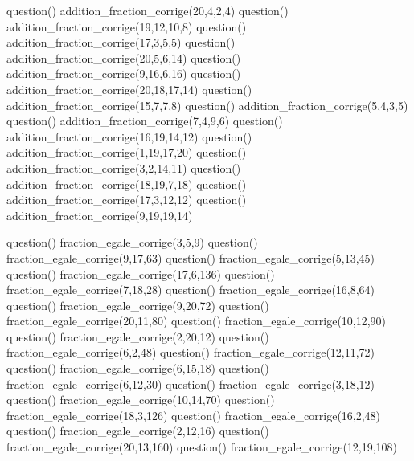 \documentclass["../Cours.tex"]{subfiles}
\begin{document}
\clearpage
\CORRECTIONS

\begin{questions}

    \vspace{-1.5em}
        \begin{multicols}{2}\small
        \begin{luacode}
            question() addition_fraction_corrige(20,4,2,4)
            question() addition_fraction_corrige(19,12,10,8)
            question() addition_fraction_corrige(17,3,5,5)
            question() addition_fraction_corrige(20,5,6,14)
            question() addition_fraction_corrige(9,16,6,16)
            question() addition_fraction_corrige(20,18,17,14)
            question() addition_fraction_corrige(15,7,7,8)
            question() addition_fraction_corrige(5,4,3,5)
            question() addition_fraction_corrige(7,4,9,6)
            question() addition_fraction_corrige(16,19,14,12)
            question() addition_fraction_corrige(1,19,17,20)
            question() addition_fraction_corrige(3,2,14,11)
            question() addition_fraction_corrige(18,19,7,18)
            question() addition_fraction_corrige(17,3,12,12)
            question() addition_fraction_corrige(9,19,19,14)
        \end{luacode}
        \end{multicols}

    \vspace{-1.5em}
        \begin{multicols}{3}\small
        \begin{luacode}
            question() fraction_egale_corrige(3,5,9)
            question() fraction_egale_corrige(9,17,63)
            question() fraction_egale_corrige(5,13,45)
            question() fraction_egale_corrige(17,6,136)
            question() fraction_egale_corrige(7,18,28)
            question() fraction_egale_corrige(16,8,64)
            question() fraction_egale_corrige(9,20,72)
            question() fraction_egale_corrige(20,11,80)
            question() fraction_egale_corrige(10,12,90)
            question() fraction_egale_corrige(2,20,12)
            question() fraction_egale_corrige(6,2,48)
            question() fraction_egale_corrige(12,11,72)
            question() fraction_egale_corrige(6,15,18)
            question() fraction_egale_corrige(6,12,30)
            question() fraction_egale_corrige(3,18,12)
            question() fraction_egale_corrige(10,14,70)
            question() fraction_egale_corrige(18,3,126)
            question() fraction_egale_corrige(16,2,48)
            question() fraction_egale_corrige(2,12,16)
            question() fraction_egale_corrige(20,13,160)
            question() fraction_egale_corrige(12,19,108)
        \end{luacode}
        \end{multicols}


\end{questions}
\end{document}

